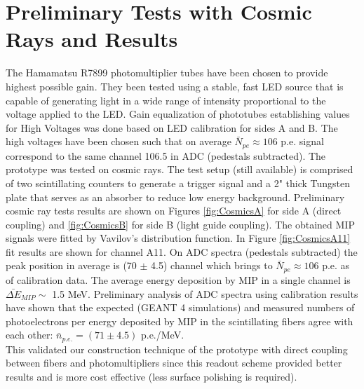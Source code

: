 \section {Preliminary Tests with Cosmic Rays and Results} 

The Hamamatsu R7899 photomultiplier tubes have been chosen to provide highest possible gain. They been tested using a stable, fast LED source that is capable of generating light in a wide range of intensity proportional to the voltage applied to the LED. Gain equalization of phototubes establishing values for High Voltages was done based on LED calibration for sides A and B. The high voltages have been chosen such that on average $\bar{N}_{pe} \approx 106$ p.e. signal correspond to the same channel 106.5 in ADC (pedestals subtracted). The prototype was tested on cosmic rays. The test setup (still available) is comprised of two scintillating counters to generate a trigger signal and a 2" thick Tungsten plate that serves as an absorber to reduce low energy background. Preliminary cosmic ray tests results are shown on Figures \ref{fig:CosmicsA} for side A (direct coupling) and \ref{fig:CosmicsB} for side B (light guide coupling). The obtained MIP signals were fitted by Vavilov’s distribution function. In Figure \ref{fig:CosmicsA11} fit results are shown for channel A11. On ADC spectra (pedestals subtracted) the peak position in average is (70 $\pm$ 4.5) channel which brings to $\bar{N}_{pe} \approx 106$ p.e. as of calibration data. The average energy deposition by MIP in a single channel is $\bar{\Delta E}_{MIP} \sim $ 1.5 MeV. Preliminary analysis of ADC spectra using calibration results have shown that the expected (GEANT 4 simulations) and measured numbers of photoelectrons per energy deposited by MIP in the scintillating fibers agree with each other: $\bar{n}_{p.e.} = (71 \pm 4.5)$ p.e./MeV.\\
This validated our construction technique of the prototype with direct coupling between fibers and photomultipliers since this readout scheme provided better results and is more cost effective (less surface polishing is required).

